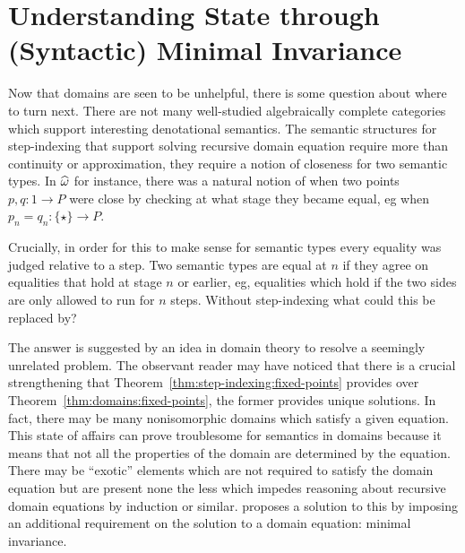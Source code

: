 \section{Understanding State through (Syntactic) Minimal Invariance}\label{sec:smi}

Now that domains are seen to be unhelpful, there is some question
about where to turn next. There are not many well-studied
algebraically complete categories~\citep{TODO-FREYD} which support
interesting denotational semantics. The semantic structures for
step-indexing that support solving recursive domain equation require
more than continuity or approximation, they require a notion of
closeness for two semantic types. In $\widehat{\omega}$ for
instance, there was a natural notion of when two points
$p, q : 1 \to P$ were close by checking at what stage they became
equal, eg when $p_n = q_n : \{\star\} \to P$.

Crucially, in order for this to make sense for semantic types every
equality was judged relative to a step. Two semantic types are equal
at $n$ if they agree on equalities that hold at stage $n$ or earlier,
eg, equalities which hold if the two sides are only allowed to run for
$n$ steps. Without step-indexing what could this be replaced by?

The answer is suggested by an idea in domain theory to resolve a
seemingly unrelated problem. The observant reader may have noticed
that there is a crucial strengthening that
Theorem~\ref{thm:step-indexing:fixed-points} provides over
Theorem~\ref{thm:domains:fixed-points}, the former provides unique
solutions. In fact, there may be many nonisomorphic domains which
satisfy a given equation. This state of affairs can prove troublesome
for semantics in domains because it means that not all the properties
of the domain are determined by the equation. There may be ``exotic''
elements which are not required to satisfy the domain equation but are
present none the less which impedes reasoning about recursive domain
equations by induction or similar. \citet{TODO-PITTS} proposes a
solution to this by imposing an additional requirement on the solution
to a domain equation: minimal invariance.

